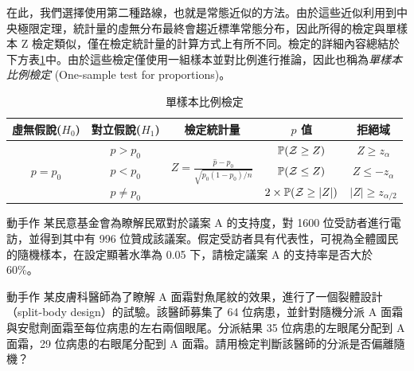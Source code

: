     \medskip

    在此，我們選擇使用第二種路線，也就是常態近似的方法。由於這些近似利用到中央極限定理，統計量的虛無分布最終會趨近標準常態分布，因此所得的檢定與單樣本 Z 檢定類似，僅在檢定統計量的計算方式上有所不同。檢定的詳細內容總結於下方表\ref{tab:one_sample_proportion}中。由於這些檢定僅使用一組樣本並對比例進行推論，因此也稱為\textit{單樣本比例檢定} (One-sample test for proportions)。

    \begin{table}[htbp]
        \begin{center}
            \begin{tabular}{ccccc}
                \toprule
                虛無假說($H_0$) & 對立假說($H_1$) & 檢定統計量 & $p$ 值 & 拒絕域\\
                \hline
                \multirow{3}{*}{$p = p_0$} & $p > p_0$ & \multirow{3}{*}{$Z = \frac{\hat{p}-p_0}{\sqrt{p_0(1-p_0)/n}}$} & $\mathbb{P}(\mathcal{Z} \ge Z)$ & $Z \ge z_{\alpha}$\\
                & $p < p_0$ & &$\mathbb{P}(\mathcal{Z} \le Z)$&$Z \le -z_{\alpha}$\\
                & $p \ne p_0$ & &$2\times\mathbb{P}(\mathcal{Z} \ge |Z|)$&$|Z| \ge z_{\alpha/2}$\\
                \bottomrule
            \end{tabular}
            \caption{單樣本比例檢定\label{tab:one_sample_proportion}}
        \end{center}
    \end{table}

    \begin{custom}{動手作}
        某民意基金會為瞭解民眾對於議案 A 的支持度，對 1600 位受訪者進行電訪，並得到其中有 996 位贊成該議案。假定受訪者具有代表性，可視為全體國民的隨機樣本，在設定顯著水準為 0.05 下，請檢定議案 A 的支持率是否大於 60\%。
    \end{custom}

    \answerbox{250pt}

    \bigskip

    \begin{custom}{動手作}
        某皮膚科醫師為了瞭解 A 面霜對魚尾紋的效果，進行了一個裂體設計（split-body design）的試驗。該醫師募集了 64 位病患，並針對隨機分派 A 面霜與安慰劑面霜至每位病患的左右兩個眼尾。分派結果 35 位病患的左眼尾分配到 A 面霜，29 位病患的右眼尾分配到 A 面霜。請用檢定判斷該醫師的分派是否偏離隨機？
    \end{custom}

    \answerbox{250pt}


